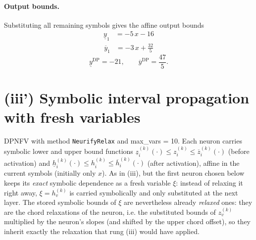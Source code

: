\documentclass[11pt]{article}
\begin{document}
\paragraph{Output bounds.}
Substituting all remaining symbols gives the affine output bounds
\begin{align*}
\underline{y}_{1} &= -5\,x - 16
\end{align*}
\begin{align*}
\overline{y}_{1} &= -3\,x + \frac{32}{5}
\end{align*}
\begin{equation*}
\underline{y}^{\text{DP}} = -21, \qquad \overline{y}^{\text{DP}} = \frac{47}{5}.
\end{equation*}

\section{(iii') Symbolic interval propagation with fresh variables}
DPNFV with method \texttt{NeurifyRelax} and max\_vars = 10. Each neuron carries symbolic lower and upper bound functions
$\underline{z}^{(k)}_i(\cdot) \le z^{(k)}_i \le \overline{z}^{(k)}_i(\cdot)$ (before activation)
and $\underline{h}^{(k)}_i(\cdot) \le h^{(k)}_i \le \overline{h}^{(k)}_i(\cdot)$ (after activation),
affine in the current symbols (initially only $x$).
As in (iii), but the first neuron chosen below keeps its \emph{exact}
symbolic dependence as a fresh variable $\xi$: instead of relaxing it right away, $\xi = h^{(k)}_v$
is carried symbolically and only substituted at the next layer. The stored symbolic bounds of $\xi$
are nevertheless already \emph{relaxed} ones: they are the chord relaxations of the neuron, i.e.
the substituted bounds of $z^{(k)}_v$ multiplied by the neuron's slopes (and shifted by the upper
chord offset), so they inherit exactly the relaxation that rung (iii) would have applied.
\end{document}
